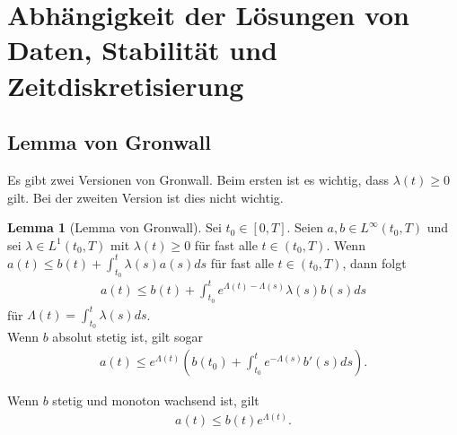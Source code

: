 \documentclass[a4paper]{article}
\theoremstyle{definition}
\newtheorem{lemma}[theorem]{Lemma}
\begin{document}
\section{Abhängigkeit der Lösungen von Daten, Stabilität und Zeitdiskretisierung}

\subsection{Lemma von Gronwall}
Es gibt zwei Versionen von Gronwall. Beim ersten ist es wichtig, dass $\lambda(t) \geq 0$ gilt. Bei der zweiten Version ist dies nicht wichtig.

\begin{lemma}[Lemma von Gronwall]\label{lemma:gronwall}
Sei $t_0 \in [0,T]$. Seien $a,b \in L^\infty(t_0, T)$ und sei $\lambda \in L^1(t_0, T)$ mit $\lambda(t) \geq 0$ für fast alle $t \in (t_0, T)$. Wenn $a(t) \leq b(t) + \int^t_{t_0} \lambda(s) a(s) ds$ für fast alle $t \in (t_0, T)$, dann folgt 
\begin{align*}
    a(t) \leq b(t) + \int^t_{t_0}e^{\Lambda(t) - \Lambda(s)}\lambda(s) b(s) ds
\end{align*}
für $\Lambda(t) = \int^t_{t_0} \lambda(s) ds$.\\

Wenn $b$ absolut stetig ist, gilt sogar 
\begin{align*}
    a(t) \leq e^{\Lambda(t)}\left(b(t_0) + \int^t_{t_0} e^{-\Lambda(s)} b'(s) ds\right).
\end{align*}

Wenn $b$ stetig und monoton wachsend ist, gilt 
\begin{align*}
    a(t) \leq b(t)e^{\Lambda(t)}.
\end{align*}
\end{lemma}
\end{document}
